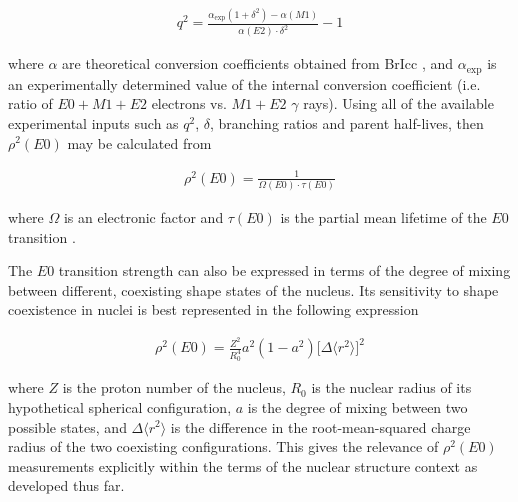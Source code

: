 \begin{gather}
q^2 = \frac{\alpha_\mathrm{exp}(1+\delta^2)-\alpha(M1)}{\alpha(E2)\cdot \delta^2}-1
\label{equation: squared}
\end{gather}

where $\alpha$ are theoretical conversion coefficients obtained from BrIcc \cite{KIBEDI2008202}, and $\alpha_\mathrm{exp}$ is an experimentally determined value of the internal conversion coefficient (i.e. ratio of $E0+M1+E2$ electrons vs. $M1+E2$ $\gamma$ rays). Using all of the available experimental inputs such as $q^2$, $\delta$, branching ratios and parent half-lives, then $\rho^2(E0)$ may be calculated from

\begin{gather}
\rho^2(E0) = \frac{1}{\Omega(E0) \cdot \tau(E0)}
\label{equation: E0 strength}
\end{gather}

where $\Omega$ is an electronic factor and $\tau(E0)$ is the partial mean lifetime of the $E0$ transition \cite{KIBEDI2008202}. 

The $E0$ transition strength can also be expressed in terms of the degree of mixing between different, coexisting shape states of the nucleus. Its sensitivity to shape coexistence in nuclei is best represented in  the following expression \cite{Wood1999}

\begin{gather}
\rho^2(E0) = \frac{Z^2}{R_0^4}a^2(1-a^2)\Big[\Delta \langle r^2 \rangle \Big]^2
\label{equation: E0 as probe of shape coexistence}
\end{gather}

where $Z$ is the proton number of the nucleus, $R_0$ is the nuclear radius of its hypothetical spherical configuration, $a$ is the degree of mixing between two possible states, and $\Delta \langle r^2 \rangle$ is the difference in the root-mean-squared charge radius of the two coexisting configurations. This gives the relevance of $\rho^2(E0)$ measurements explicitly within the terms of the nuclear structure context as developed thus far. 

\endinput

Any text after an \endinput is ignored.
You could put scraps here or things in progress.


